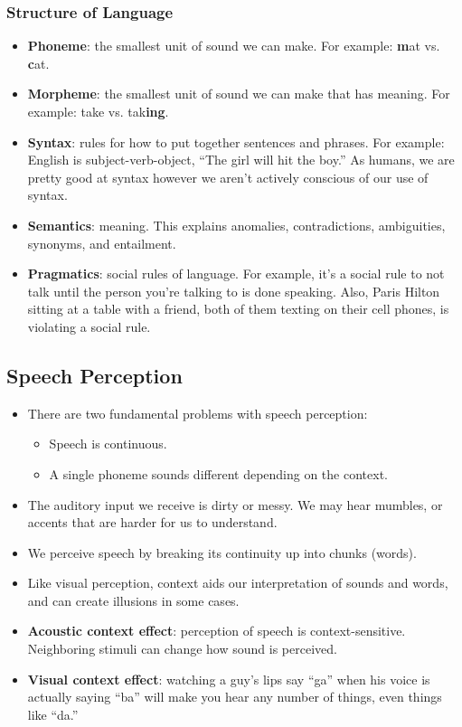 \documentclass[]{article}
\begin{document}
			\subsubsection{Structure of Language}
				\begin{itemize}
					\item \textbf{Phoneme}: the smallest unit of sound we can make. For example: \textbf{m}at vs. \textbf{c}at.
					\item \textbf{Morpheme}: the smallest unit of sound we can make that has meaning. For example: take vs. tak\textbf{ing}.
					\item \textbf{Syntax}: rules for how to put together sentences and phrases. For example: English is subject-verb-object, ``The girl will hit the boy.'' As humans, we are pretty good at syntax however we aren't actively conscious of our use of syntax.
					\item \textbf{Semantics}: meaning. This explains anomalies, contradictions, ambiguities, synonyms, and entailment.
					\item \textbf{Pragmatics}: social rules of language. For example, it's a social rule to not talk until the person you're talking to is done speaking. Also, Paris Hilton sitting at a table with a friend, both of them texting on their cell phones, is violating a social rule.
				\end{itemize}

		\subsection{Speech Perception}
			\begin{itemize}
				\item There are two fundamental problems with speech perception:
					\begin{itemize}
						\item Speech is continuous.
						\item A single phoneme sounds different depending on the context.
					\end{itemize}
				\item The auditory input we receive is dirty or messy. We may hear mumbles, or accents that are harder for us to understand.
				\item We perceive speech by breaking its continuity up into chunks (words).
				\item Like visual perception, context aids our interpretation of sounds and words, and can create illusions in some cases.
				\item \textbf{Acoustic context effect}: perception of speech is context-sensitive. Neighboring stimuli can change how sound is perceived.
				\item \textbf{Visual context effect}: watching a guy's lips say ``ga'' when his voice is actually saying ``ba'' will make you hear any number of things, even things like ``da.''
			\end{itemize}
\end{document}
